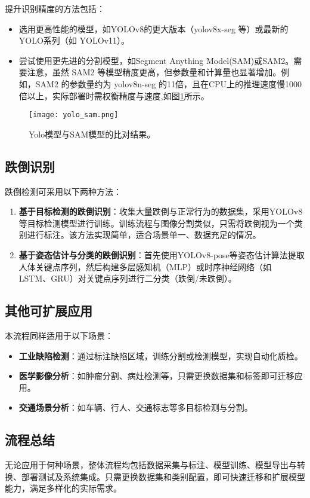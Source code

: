 提升识别精度的方法包括：
\begin{itemize}
    \item 选用更高性能的模型，如YOLOv8的更大版本（yolov8x-seg 等）或最新的YOLO系列（如 YOLOv11）。
    \item 尝试使用更先进的分割模型，如Segment Anything Model(SAM)或SAM2。需要注意，虽然 SAM2 等模型精度更高，但参数量和计算量也显著增加。例如，SAM2 的参数量约为 yolov8n-seg 的11倍，且在CPU上的推理速度慢1000倍以上，实际部署时需权衡精度与速度,如图\ref{fig:yolo_sam}所示。
\end{itemize}
\begin{figure}[H]  %
    \centering  %
    \texttt{[image: yolo\_sam.png]}  %
    \caption{Yolo模型与SAM模型的比对结果。}  %
    \label{fig:yolo_sam}
\end{figure}

\subsection{跌倒识别}

跌倒检测可采用以下两种方法：

\begin{enumerate}
    \item \textbf{基于目标检测的跌倒识别}：收集大量跌倒与正常行为的数据集，采用YOLOv8等目标检测模型进行训练。训练流程与图像分割类似，只需将跌倒视为一个类别进行标注。该方法实现简单，适合场景单一、数据充足的情况。
    \item \textbf{基于姿态估计与分类的跌倒识别}：首先使用YOLOv8-pose等姿态估计算法提取人体关键点序列，然后构建多层感知机（MLP）或时序神经网络（如 LSTM、GRU）对关键点序列进行二分类（跌倒/未跌倒）。
\end{enumerate}

\subsection{其他可扩展应用}

本流程同样适用于以下场景：
\begin{itemize}
    \item \textbf{工业缺陷检测}：通过标注缺陷区域，训练分割或检测模型，实现自动化质检。
    \item \textbf{医学影像分析}：如肿瘤分割、病灶检测等，只需更换数据集和标签即可迁移应用。
    \item \textbf{交通场景分析}：如车辆、行人、交通标志等多目标检测与分割。
\end{itemize}

\subsection{流程总结}

无论应用于何种场景，整体流程均包括数据采集与标注、模型训练、模型导出与转换、部署测试及系统集成。只需更换数据集和类别配置，即可快速迁移和扩展模型能力，满足多样化的实际需求。
